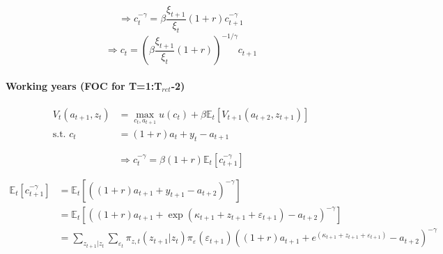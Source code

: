 \documentclass[11pt]{article}
\begin{document}
$$ \Rightarrow c_t^{-\gamma} = \beta \frac{\xi_{t+1}}{\xi_t} (1+r) c_{t+1}^{-\gamma} $$
$$ \Rightarrow c_t = \left(\beta \frac{\xi_{t+1}}{\xi_t} (1+r) \right)^{-1/\gamma} c_{t+1} $$


\paragraph{Working years (FOC for T=1:T$_{ret}$-2)}

\begin{equation*}
\begin{split}
 V_{t}(a_{t+1}, z_t) &= \max_{c_t,a_{t+1}} u(c_{t}) + \beta \mathbb{E}_t[V_{t+1}(a_{t+2}, z_{t+1})] \\
 \text{s.t. } c_t &= (1+r) a_{t}+y_t - a_{t+1}
\end{split}
\end{equation*}

$$ \Rightarrow c_t^{-\gamma} = \beta (1+r) \mathbb{E}_t [c_{t+1}^{-\gamma}] $$

\begin{equation*}
\begin{split}
\mathbb{E}_t [c_{t+1}^{-\gamma}] &=
      \mathbb{E}_t [\left( (1+r)a_{t+1} + y_{t+1} - a_{t+2} \right)^{-\gamma}] \\
      &= \mathbb{E}_t [\left((1+r)a_{t+1} + \exp(\kappa_{t+1} + z_{t+1} + \varepsilon_{t+1}) - a_{t+2} \right)^{-\gamma}] \\
      &= \sum_{z_{t+1}|z_t} \sum_{\varepsilon_t} \pi_{z,t}(z_{t+1}|z_t) \pi_\varepsilon(\varepsilon_{t+1}) \left((1+r)a_{t+1} + e^{(\kappa_{t+1} + z_{t+1} + \varepsilon_{t+1})} - a_{t+2} \right)^{-\gamma}
\end{split}
\end{equation*}


\end{document}
